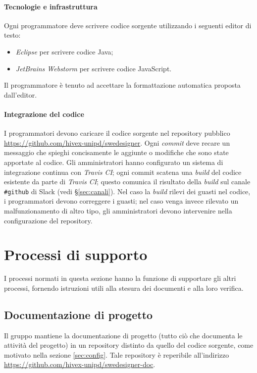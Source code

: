 \paragraph{Tecnologie e infrastruttura} Ogni programmatore deve scrivere codice sorgente utilizzando i seguenti editor di testo:
\begin{itemize}
	\item \emph{Eclipse} per scrivere codice Java;
	\item \emph{JetBrains Webstorm} per scrivere codice JavaScript.
\end{itemize}
Il programmatore è tenuto ad accettare la formattazione automatica proposta dall'editor.

\paragraph{Integrazione del codice} \label{sec:integraz} I programmatori devono caricare il codice sorgente nel repository pubblico \url{https://github.com/hivex-unipd/swedesigner}. Ogni \emph{commit} deve recare un messaggio che spieghi concisamente le aggiunte o modifiche che sono state apportate al codice. Gli amministratori hanno configurato un sistema di integrazione continua con \emph{Travis CI}; ogni commit scatena una \emph{build} del codice esistente da parte di \emph{Travis CI}; questo comunica il risultato della \emph{build} sul canale \texttt{\#github} di Slack (vedi §\ref{sec:canali}). Nel caso la \emph{build} rilevi dei guasti nel codice, i programmatori devono correggere i guasti; nel caso venga invece rilevato un malfunzionamento di altro tipo, gli amministratori devono intervenire nella configurazione del repository.






\section{Processi di supporto} \label{sec:supporto}
I processi normati in questa sezione hanno la funzione di supportare gli altri processi, fornendo istruzioni utili alla stesura dei documenti e alla loro verifica.


\subsection{Documentazione di progetto} \label{sec:doc}
Il gruppo mantiene la documentazione di progetto (tutto ciò che documenta le attività del progetto) in un repository distinto da quello del codice sorgente, come motivato nella sezione \ref{sec:config}. Tale repository è reperibile all'indirizzo \url{https://github.com/hivex-unipd/swedesigner-doc}.

